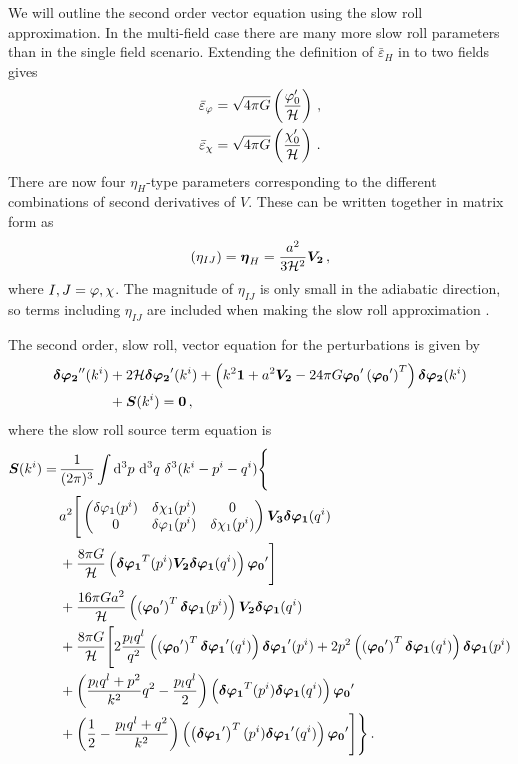 We will outline the second order vector equation using the slow roll approximation.
In the multi-field case there are many more slow roll parameters than in the
single field scenario. Extending the definition of $\bar{\varepsilon}_H$ in
 to two fields gives
% 
\begin{align}
 \bar{\varepsilon}_{\varphi} &= \sqrt{4\pi G} \left( \frac{\varphi_0'}{\mathcal{H}} \right) \,,\\
 \bar{\varepsilon}_\chi &= \sqrt{4\pi G} \left( \frac{\chi_0'}{\mathcal{H}} \right)\,.
\end{align}
% 
There are now four $\eta_H$-type parameters corresponding to the different
combinations of second derivatives of $V$. These can be written together in matrix form
as
% 
\begin{equation}
 (\eta_{IJ}) = \boldsymbol{\eta}_H = \frac{a^2}{3\mathcal{H}^2} \boldsymbol{V_2} \,,
\end{equation}
% 
where $I,J = \varphi,\chi$.
The magnitude of $\eta_{IJ}$ is only small in the adiabatic direction, so terms
including $\eta_{IJ}$ are included when making the slow roll approximation
\cite{Malik:2006ir}.

The second order, slow roll, vector equation for the perturbations is given by 
% 
\begin{align}
 \boldsymbol{\delta\varphi_{2}}''(k^i) &+ 2\mathcal{H}\boldsymbol{\delta\varphi_{2}}'(k^i) 
 + \left( k^2\boldsymbol{1} + a^2\boldsymbol{V_2} - 24\pi G \boldsymbol{\varphi_0}' \left(\boldsymbol{\varphi_0}'\right)^T \right)
       \boldsymbol{\delta\varphi_{2}}(k^i) \nonumber\\ 
 &+ \boldsymbol{S}(k^i) = \boldsymbol{0}\,,
\end{align}
% 
where the slow roll source term equation is
% 
\begin{align}
\label{eq:src-vector-res}
\bm{S}(\kvi) =\,  
&\frac{1}{(2\pi)^3}\int \d^3p\ \d^3q\ \delta^3(\kvi-\pvi-\qvi) \Bigg\{ \\
% 
&a^2 \Bigg[ 
\begin{pmatrix}
\dvp1(\pvi) & \delta \chi_1(\pvi) & 0  \nonumber\\
0           & \dvp1(\pvi)         & \delta \chi_1(\pvi) 
\end{pmatrix}
\bm{V_3}\bm{\dvp1}(\qvi) \nonumber \\
% 
&+ \frac{8\pi G}{\H}\left( 
    \bm{\dvp1}^T(\pvi) \bm{V_2} \bm{\dvp1}(\qvi)
\right) \bm{\vp_0}' \Bigg] \nonumber\\
% 
&+ \frac{16\pi G a^2}{\H}\left(\left(\bm{\vp_0}'\right)^T \bm{\dvp1}(\pvi) \right)
    \bm{V_2} \bm{\dvp1}(\qvi) \nonumber \\
% 
&+ \frac{8\pi G}{\H} \Bigg[ 2\frac{p_l q^l}{q^2} 
      \left( \left(\bm{\vp_0}'\right)^T \bm{\dvp1}'(\qvi) \right) \bm{\dvp1}'(\pvi)
 + 2p^2 \left( \left(\bm{\vp_0}'\right)^T \bm{\dvp1}(\qvi) \right) \bm{\dvp1}(\pvi) \nonumber \\
% 
&+\left( \frac{p_l q^l + p^2}{k^2}q^2 - \frac{p_l q^l}{2} \right) 
      \left( \bm{\dvp1}^T(\pvi) \bm{\dvp1}(\qvi) \right) \bm{\vp_0}' \nonumber \\
% 
&+\left(\frac{1}{2} -\frac{p_l q^l + q^2}{k^2}\right) 
      \left( \left(\bm{\dvp1}'\right)^T(\pvi) \bm{\dvp1}'(\qvi) \right) \bm{\vp_0}' \Bigg] \Bigg\}
\,.
\end{align}

